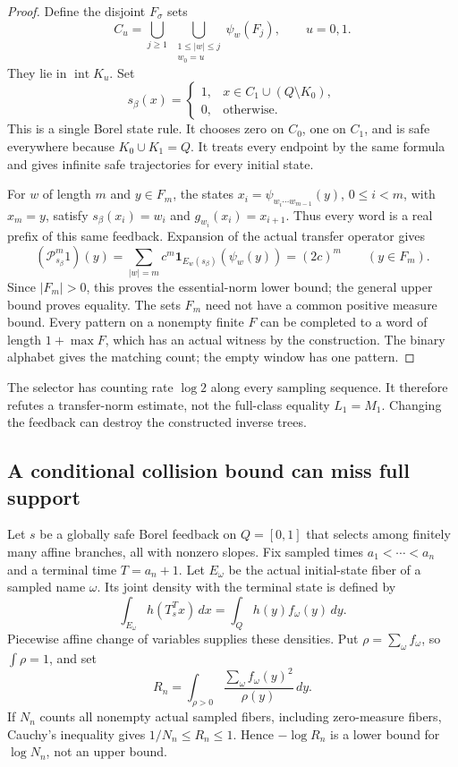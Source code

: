 \documentclass[11pt,reqno]{amsart}
\numberwithin{equation}{section}
\theoremstyle{definition}
\newcommand{\one}{\mathbf 1}
\newcommand{\intr}{\operatorname{int}}
\begin{document}
\begin{proof}
Define the disjoint $F_\sigma$ sets
\[
 C_u=\bigcup_{j\ge1}\ 
      \bigcup_{\substack{1\le|w|\le j\\w_0=u}}\psi_w(F_j),
 \qquad u=0,1.
\]
They lie in $\intr K_u$. Set
\[
 s_\beta(x)=
 \begin{cases}
  1,&x\in C_1\cup(Q\setminus K_0),\\
  0,&\text{otherwise}.
 \end{cases}
\]
This is a single Borel state rule. It chooses zero on $C_0$,
one on $C_1$, and is safe everywhere because $K_0\cup K_1=Q$.
It treats every endpoint by the same formula and gives infinite
safe trajectories for every initial state.

For $w$ of length $m$ and $y\in F_m$, the states
$x_i=\psi_{w_i\cdots w_{m-1}}(y)$, $0\le i<m$, with $x_m=y$,
satisfy $s_\beta(x_i)=w_i$ and $g_{w_i}(x_i)=x_{i+1}$.
Thus every word is a real prefix of this same feedback.
Expansion of the actual transfer operator gives
\[
 (\mathcal P_{s_\beta}^m1)(y)
 =\sum_{|w|=m}c^m\one_{E_w(s_\beta)}(\psi_w(y))
 =(2c)^m\qquad(y\in F_m).
\]
Since $|F_m|>0$, this proves the essential-norm lower bound;
the general upper bound proves equality. The sets $F_m$ need
not have a common positive measure bound.
Every pattern on a nonempty finite $F$ can be completed to a word of
length $1+\max F$, which has an actual witness by the
construction. The binary alphabet gives the matching count; the
empty window has one pattern.
\end{proof}

The selector has counting rate $\log2$ along every sampling
sequence. It therefore refutes a transfer-norm estimate, not
the full-class equality $L_1=M_1$. Changing the feedback can
destroy the constructed inverse trees.

\subsection{A conditional collision bound can miss full support}

Let $s$ be a globally safe Borel feedback on $Q=[0,1]$ that selects
among finitely many affine branches, all with nonzero slopes. Fix
sampled times $a_1<\cdots<a_n$ and a terminal time $T=a_n+1$.
Let $E_\omega$ be the actual initial-state fiber of a sampled
name $\omega$. Its joint density with the terminal state is
defined by
\[
 \int_{E_\omega}h(T_s^Tx)\,dx
 =\int_Q h(y)f_\omega(y)\,dy.
\]
Piecewise affine change of variables supplies these densities.
Put $\rho=\sum_\omega f_\omega$, so $\int\rho=1$, and set
\[
 R_n=\int_{\rho>0}
       \frac{\sum_\omega f_\omega(y)^2}{\rho(y)}\,dy.
\]
If $N_n$ counts all nonempty actual sampled fibers, including
zero-measure fibers, Cauchy's inequality gives
$1/N_n\le R_n\le1$. Hence $-\log R_n$ is a lower bound for
$\log N_n$, not an upper bound.
\end{document}
